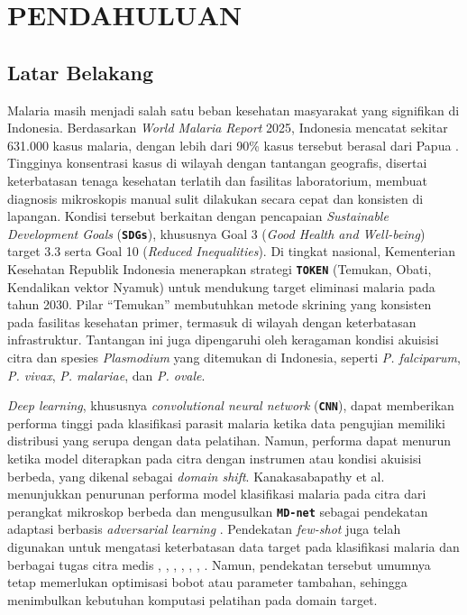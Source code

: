 \documentclass[conference]{IEEEtran}
\newcommand{\nama}[1]{\textbf{\texttt{#1}}}
\begin{document}
\section{PENDAHULUAN}
\subsection{Latar Belakang}
Malaria masih menjadi salah satu beban kesehatan masyarakat yang signifikan di Indonesia. Berdasarkan \textit{World Malaria Report} 2025, Indonesia mencatat sekitar 631.000 kasus malaria, dengan lebih dari 90\% kasus tersebut berasal dari Papua \cite{b1}. Tingginya konsentrasi kasus di wilayah dengan tantangan geografis, disertai keterbatasan tenaga kesehatan terlatih dan fasilitas laboratorium, membuat diagnosis mikroskopis manual sulit dilakukan secara cepat dan konsisten di lapangan.
Kondisi tersebut berkaitan dengan pencapaian \textit{Sustainable Development Goals} (\nama{SDGs}), khususnya Goal 3 (\textit{Good Health and Well-being}) target 3.3 serta Goal 10 (\textit{Reduced Inequalities}). Di tingkat nasional, Kementerian Kesehatan Republik Indonesia menerapkan strategi \nama{TOKEN} (Temukan, Obati, Kendalikan vektor Nyamuk) untuk mendukung target eliminasi malaria pada tahun 2030. Pilar ``Temukan'' membutuhkan metode skrining yang konsisten pada fasilitas kesehatan primer, termasuk di wilayah dengan keterbatasan infrastruktur. Tantangan ini juga dipengaruhi oleh keragaman kondisi akuisisi citra dan spesies \textit{Plasmodium} yang ditemukan di Indonesia, seperti \textit{P. falciparum}, \textit{P. vivax}, \textit{P. malariae}, dan \textit{P. ovale}.

\textit{Deep learning}, khususnya \textit{convolutional neural network} (\nama{CNN}), dapat memberikan performa tinggi pada klasifikasi parasit malaria ketika data pengujian memiliki distribusi yang serupa dengan data pelatihan. Namun, performa dapat menurun ketika model diterapkan pada citra dengan instrumen atau kondisi akuisisi berbeda, yang dikenal sebagai \textit{domain shift}. Kanakasabapathy et al. menunjukkan penurunan performa model klasifikasi malaria pada citra dari perangkat mikroskop berbeda dan mengusulkan \nama{MD-net} sebagai pendekatan adaptasi berbasis \textit{adversarial learning} \cite{b2}. Pendekatan \textit{few-shot} juga telah digunakan untuk mengatasi keterbatasan data target pada klasifikasi malaria dan berbagai tugas citra medis \cite{b3}, \cite{b4}, \cite{b5}, \cite{b6}, \cite{b7}, \cite{b8}, \cite{b9}. Namun, pendekatan tersebut umumnya tetap memerlukan optimisasi bobot atau parameter tambahan, sehingga menimbulkan kebutuhan komputasi pelatihan pada domain target.
\end{document}
